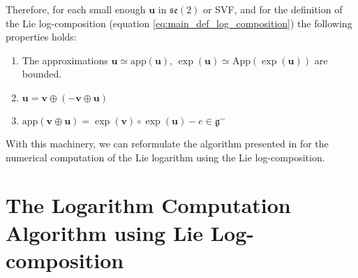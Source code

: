 \noindent
Therefore, for each small enough $\mathbf{u}$ in $\mathfrak{se}(2)$ or SVF, 
and for the definition of the Lie log-composition (equation \ref{eq:main_def_log_composition}) 
the following properties holds:
\begin{enumerate}
	\item The approximations $\mathbf{u} \simeq   \text{app} (\mathbf{u})$, $\exp(\mathbf{u}) \simeq   \text{App} (\exp(\mathbf{u})) $ are bounded.
	\item $\mathbf{u} = \mathbf{v} \oplus (-\mathbf{v} \oplus  \mathbf{u} )$
	\item $\text{app} (\mathbf{v} \oplus  \mathbf{u}) = \exp(\mathbf{v})\circ\exp(\mathbf{u}) - e \in \mathfrak{g} ^{\sim}$
\end{enumerate}

\noindent
With this machinery, we can reformulate the algorithm presented in \cite{Bossa:08} for the numerical computation of the Lie logarithm using the Lie log-composition.

\section{The Logarithm Computation Algorithm using Lie Log-composition}

